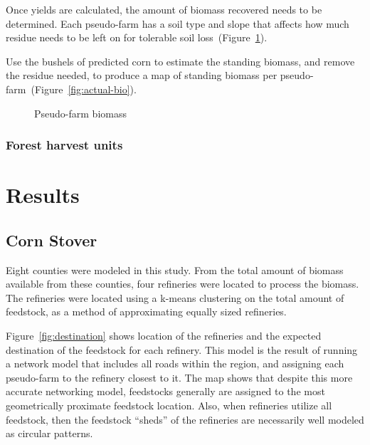 \documentclass[review,3p,authoryear,times]{elsarticle}
\begin{document}
Once yields are calculated, the amount of biomass recovered needs to
be determined. Each pseudo-farm has a soil type and slope that affects
how much residue needs to be left on for tolerable soil
loss~(Figure~\ref{fig:biomass}).

Use the bushels of predicted corn to estimate the standing biomass,
and remove the residue needed, to produce a map of standing biomass
per pseudo-farm~(Figure~\ref{fig:actual-bio}).


\begin{figure}[hpt]
  \centering
  \label{fig:biomass}
  \caption{Pseudo-farm biomass}
\end{figure}

\subsubsection{Forest harvest units}
\label{sec:fhu}




\section{Results}
\label{sec:A1results}

\subsection{Corn Stover}
\label{sec:res_corn}

Eight counties were modeled in this study.  From the total amount of
biomass available from these counties, four refineries were located to
process the biomass.  The refineries were located using a k-means
clustering on the total amount of feedstock, as a method of
approximating equally sized refineries.

Figure~\ref{fig:destination} shows location of the refineries and the
expected destination of the feedstock for each refinery.  This model
is the result of running a network model that includes all roads
within the region, and assigning each pseudo-farm to the refinery
closest to it.  The map shows that despite this more accurate
networking model, feedstocks generally are assigned to the most
geometrically proximate feedstock location.  Also, when refineries
utilize all feedstock, then the feedstock ``sheds'' of the refineries
are necessarily well modeled as circular patterns. 
\end{document}
